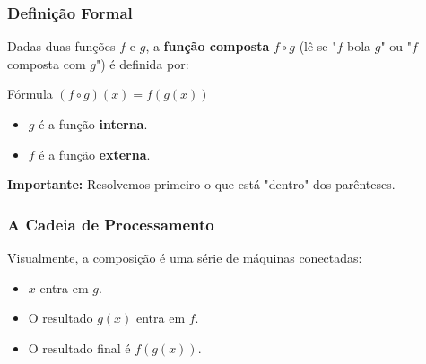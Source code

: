 \documentclass[9pt]{beamer}
\begin{document}
\begin{frame}
\frametitle{Definição Formal}
Dadas duas funções $f$ e $g$, a \textbf{função composta} $f \circ g$ (lê-se "$f$ bola $g$" ou "$f$ composta com $g$") é definida por:

\begin{block}{Fórmula}
\Large \centering $(f \circ g)(x) = f(g(x))$
\end{block}

\begin{itemize}
    \item $g$ é a função \textbf{interna}.
    \item $f$ é a função \textbf{externa}.
\end{itemize}

\textbf{Importante:} Resolvemos primeiro o que está "dentro" dos parênteses.
\end{frame}

\begin{frame}
\frametitle{A Cadeia de Processamento}
Visualmente, a composição é uma série de máquinas conectadas:

\vspace{0.8cm}
\centering
{}

\vspace{0.5cm}
\begin{itemize}
    \item $x$ entra em $g$.
    \item O resultado $g(x)$ entra em $f$.
    \item O resultado final é $f(g(x))$.
\end{itemize}
\end{frame}
\end{document}
